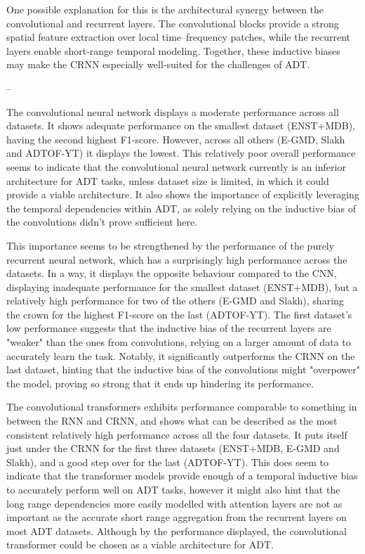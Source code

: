 One possible explanation for this is the architectural synergy between the convolutional and recurrent layers. The convolutional blocks provide a strong spatial feature extraction over local time–frequency patches, while the recurrent layers enable short-range temporal modeling. Together, these inductive biases may make the \gls{CRNN} especially well-suited for the challenges of \gls{ADT}.

--

The convolutional neural network displays a moderate performance across all datasets. It shows adequate performance on the smallest dataset (ENST+MDB), having the second highest F1-score. However, across all others (E-GMD, Slakh and ADTOF-YT) it displays the lowest. This relatively poor overall performance seems to indicate that the convolutional neural network currently is an inferior architecture for \gls{ADT} tasks, unless dataset size is limited, in which it could provide a viable architecture. It also shows the importance of explicitly leveraging the temporal dependencies within \gls{ADT}, as solely relying on the inductive bias of the convolutions didn't prove sufficient here.

This importance seems to be strengthened by the performance of the purely recurrent neural network, which has a surprisingly high performance across the datasets. In a way, it displays the opposite behaviour compared to the \gls{CNN}, displaying inadequate performance for the smallest dataset (ENST+MDB), but a relatively high performance for two of the others (E-GMD and Slakh), sharing the crown for the highest F1-score on the last (ADTOF-YT). The first dataset's low performance suggests that the inductive bias of the recurrent layers are "weaker" than the ones from convolutions, relying on a larger amount of data to accurately learn the task. Notably, it significantly outperforms the \gls{CRNN} on the last dataset, hinting that the inductive bias of the convolutions might "overpower" the model, proving so strong that it ends up hindering its performance.

The convolutional transformers exhibits performance comparable to something in between the \gls{RNN} and \gls{CRNN}, and shows what can be described as the most consistent relatively high performance across all the four datasets. It puts itself just under the \gls{CRNN} for the first three datasets (ENST+MDB, E-GMD and Slakh), and a good step over for the last (ADTOF-YT). This does seem to indicate that the transformer models provide enough of a temporal inductive bias to accurately perform well on \gls{ADT} tasks, however it might also hint that the long range dependencies more easily modelled with attention layers are not as important as the accurate short range aggregation from the recurrent layers on most \gls{ADT} datasets. Although by the performance displayed, the convolutional transformer could be chosen as a viable architecture for \gls{ADT}.

